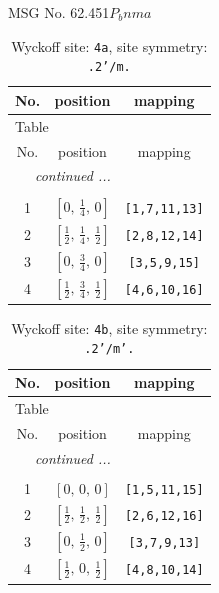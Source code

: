\documentclass[fleqn,8pt]{jsarticle}
\begin{document}
\setcounter{MaxMatrixCols}{32}

\renewcommand{\tablename}{Table~}
\renewcommand{\figurename}{Figure~}
\begin{center}
\LARGE
MSG No. 62.451\quad$P_{b}nma$
\end{center}
\renewcommand{\arraystretch}{1.2}
\begin{longtable}{ccc}
\caption{Wyckoff site: {\tt 4a}, site symmetry: {\tt .2'/m.}}
 \\
 \hline \hline
No. & position & mapping \\ \hline \endfirsthead

\multicolumn{2}{l}{\tablename\ \thetable{}} \\
 \hline \hline
No. & position & mapping \\ \hline \endhead

 \hline \hline
\multicolumn{2}{r}{\footnotesize\it continued ...} \\ \endfoot

 \hline \hline
\multicolumn{2}{r}{} \\ \endlastfoot

1 & $\left[ 0,\, \frac{1}{4},\, 0 \right]$ & {\tt [1,7,11,13]} \\ \hline
2 & $\left[ \frac{1}{2},\, \frac{1}{4},\, \frac{1}{2} \right]$ & {\tt [2,8,12,14]} \\ \hline
3 & $\left[ 0,\, \frac{3}{4},\, 0 \right]$ & {\tt [3,5,9,15]} \\ \hline
4 & $\left[ \frac{1}{2},\, \frac{3}{4},\, \frac{1}{2} \right]$ & {\tt [4,6,10,16]} \\
\end{longtable}
\renewcommand{\arraystretch}{1.2}
\begin{longtable}{ccc}
\caption{Wyckoff site: {\tt 4b}, site symmetry: {\tt .2'/m'.}}
 \\
 \hline \hline
No. & position & mapping \\ \hline \endfirsthead

\multicolumn{2}{l}{\tablename\ \thetable{}} \\
 \hline \hline
No. & position & mapping \\ \hline \endhead

 \hline \hline
\multicolumn{2}{r}{\footnotesize\it continued ...} \\ \endfoot

 \hline \hline
\multicolumn{2}{r}{} \\ \endlastfoot

1 & $\left[ 0,\, 0,\, 0 \right]$ & {\tt [1,5,11,15]} \\ \hline
2 & $\left[ \frac{1}{2},\, \frac{1}{2},\, \frac{1}{2} \right]$ & {\tt [2,6,12,16]} \\ \hline
3 & $\left[ 0,\, \frac{1}{2},\, 0 \right]$ & {\tt [3,7,9,13]} \\ \hline
4 & $\left[ \frac{1}{2},\, 0,\, \frac{1}{2} \right]$ & {\tt [4,8,10,14]} \\
\end{longtable}
\end{document}
